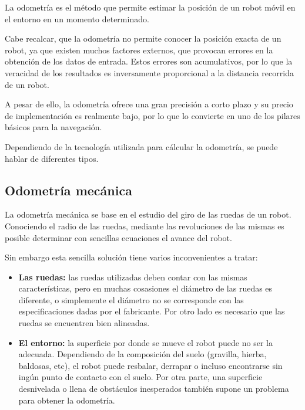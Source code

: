 

La odometría es el método que permite estimar la posición de un robot móvil en
el entorno en un momento determinado. 

Cabe recalcar, que la odometría no permite conocer la posición exacta de un
robot, ya que existen muchos factores externos, que provocan errores en la
obtención de los datos de entrada. Estos errores son acumulativos, por lo que
la veracidad de los resultados es inversamente proporcional a la distancia
recorrida de un robot.

A pesar de ello, la odometría ofrece una gran precisión a corto plazo y su
precio de implementación es realmente bajo, por lo que lo convierte en uno de
los pilares básicos para la navegación. 

Dependiendo de la tecnología utilizada para cálcular la odometría, se puede 
hablar de diferentes tipos.

\subsection{Odometría mecánica}
La odometría mecánica se base en el estudio del giro de las ruedas de un robot.
Conociendo el radio de las ruedas, mediante las revoluciones de las mismas es
posible determinar con sencillas ecuaciones el avance del robot.

Sin embargo esta sencilla solución tiene varios inconvenientes a tratar:

\begin{itemize}
  \item \textbf{Las ruedas:} las ruedas utilizadas deben contar con las mismas
  características, pero en muchas cosasiones el diámetro de las ruedas es
  diferente, o simplemente el diámetro no se corresponde con las
  especificaciones dadas por el fabricante. Por otro lado es necesario que las
  ruedas se encuentren bien alineadas.
  \item \textbf{El entorno:} la superficie por donde se mueve el robot puede no
  ser la adecuada. Dependiendo de la composición del suelo (gravilla, hierba,
  baldosas, etc), el robot puede resbalar, derrapar o incluso encontrarse sin
  ingún punto de contacto con el suelo. Por otra parte, una superficie
  desnivelada o llena de obstáculos inesperados también supone un problema para
  obtener la odometría.
\end{itemize}


